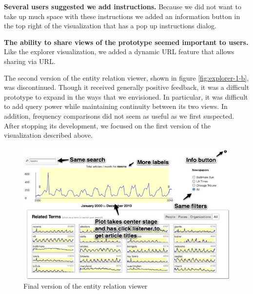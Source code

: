 \textbf{Several users suggested we add instructions.} Because we did not want to take up much space with these instructions we added an information button in the top right of the visualization that has a pop up instructions dialog.

\textbf{The ability to share views of the prototype seemed important to users.} Like the explorer visualization, we added a dynamic URL feature that allows sharing via URL.

The second version of the entity relation viewer, shown in figure \ref{fig:explorer-1-b}, was discontinued. Though it received generally positive feedback, it was a difficult prototype to expand in the ways that we envisioned. In particular, it was difficult to add query power while maintaining continuity between its two views. In addition, frequency comparisons did not seem as useful as we first suspected. After stopping its development, we focused on the first version of the visualization described above.

\begin{figure}[htb]
  \centerline{
    \includegraphics[scale=0.37]{figures/finalTe.jpg}
  }
  \caption{Final version of the entity relation viewer}
  \label{fig:explorer-1}
\end{figure}
